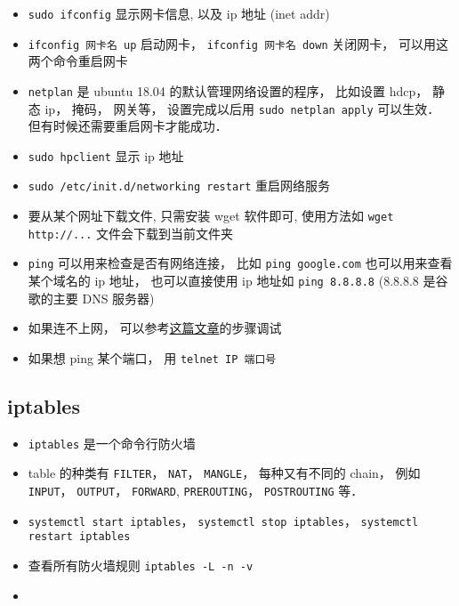 
\begin{issues}
\issueDraft
\end{issues}

\begin{itemize}
\item \verb`sudo ifconfig` 显示网卡信息, 以及 ip 地址 (inet addr)
\item \verb`ifconfig 网卡名 up` 启动网卡， \verb`ifconfig 网卡名 down` 关闭网卡， 可以用这两个命令重启网卡
\item \verb`netplan` 是 ubuntu 18.04 的默认管理网络设置的程序， 比如设置 hdcp， 静态 ip， 掩码， 网关等， 设置完成以后用 \verb`sudo netplan apply` 可以生效． 但有时候还需要重启网卡才能成功．
\item \verb`sudo hpclient` 显示 ip 地址
\item \verb`sudo /etc/init.d/networking restart` 重启网络服务 
\item 要从某个网址下载文件, 只需安装 wget 软件即可, 使用方法如 \verb`wget http://...` 文件会下载到当前文件夹
\item \verb`ping` 可以用来检查是否有网络连接， 比如 \verb`ping google.com` 也可以用来查看某个域名的 ip 地址， 也可以直接使用 ip 地址如 \verb`ping 8.8.8.8` (8.8.8.8 是谷歌的主要 DNS 服务器)
\item 如果连不上网， 可以参考\href{https://upcloud.com/community/tutorials/troubleshoot-network-connectivity-linux-server/}{这篇文章}的步骤调试
\item 如果想 ping 某个端口， 用 \verb|telnet IP 端口号|
\end{itemize}

\subsection{iptables}
\begin{itemize}
\item \verb|iptables| 是一个命令行防火墙
\item table 的种类有 \verb|FILTER|， \verb|NAT|， \verb|MANGLE|， 每种又有不同的 chain， 例如 \verb|INPUT|， \verb|OUTPUT|， \verb|FORWARD|,  \verb|PREROUTING|， \verb|POSTROUTING| 等．
\item \verb|systemctl start iptables|， \verb|systemctl stop iptables|， \verb|systemctl restart iptables|
\item 查看所有防火墙规则 \verb|iptables -L -n -v|
\item 
\end{itemize}
